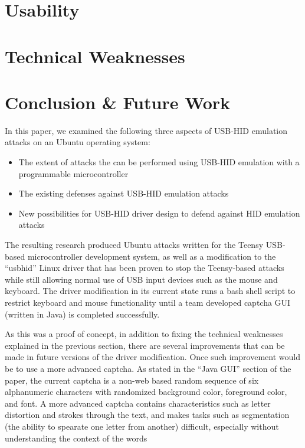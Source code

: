 \documentclass[pagenumbers]{ieee}
\begin{document}

\section{Usability}


\section{Technical Weaknesses}


\section{Conclusion \& Future Work}

In this paper, we examined the following three aspects of USB-HID emulation attacks on an Ubuntu operating system:

\begin{itemize}
\item The extent of attacks the can be performed using USB-HID emulation with a programmable microcontroller
\item The existing defenses against USB-HID emulation attacks
\item New possibilities for USB-HID driver design to defend against HID emulation attacks
\end{itemize}

The resulting research produced Ubuntu attacks written for the Teensy USB-based microcontroller development system, as well as a modification to the ``usbhid'' Linux driver that has been proven to stop the Teensy-based attacks while still allowing normal use of USB input devices such as the mouse and keyboard. The driver modification in its current state runs a bash shell script to restrict keyboard and mouse functionality until a team developed captcha GUI (written in Java) is completed successfully.

As this was a proof of concept, in addition to fixing the technical weaknesses explained in the previous section, there are several improvements that can be made in future versions of the driver modification. Once such improvement would be to use a more advanced captcha. As stated in the ``Java GUI'' section of the paper, the current captcha is a non-web based random sequence of six alphanumeric characters with randomized background color, foreground color, and font. A more advanced captcha contains characteristics such as letter distortion and strokes through the text, and makes tasks such as segmentation (the ability to spearate one letter from another) difficult, especially without understanding the context of the words %
\end{document}
